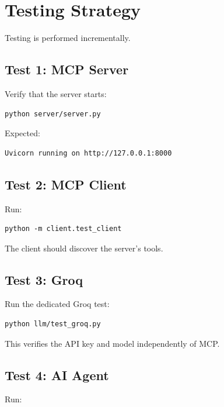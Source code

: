\documentclass[11pt,a4paper]{article}
\begin{document}
\section{Testing Strategy}

Testing is performed incrementally.

\subsection{Test 1: MCP Server}

Verify that the server starts:

\begin{lstlisting}[style=terminal]
python server/server.py
\end{lstlisting}

Expected:

\begin{lstlisting}[style=terminal]
Uvicorn running on http://127.0.0.1:8000
\end{lstlisting}

\subsection{Test 2: MCP Client}

Run:

\begin{lstlisting}[style=terminal]
python -m client.test_client
\end{lstlisting}

The client should discover the server's tools.

\subsection{Test 3: Groq}

Run the dedicated Groq test:

\begin{lstlisting}[style=terminal]
python llm/test_groq.py
\end{lstlisting}

This verifies the API key and model independently of MCP.

\subsection{Test 4: AI Agent}

Run:
\end{document}
